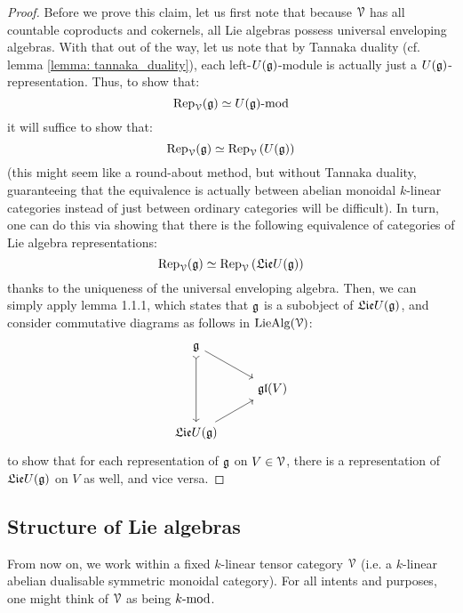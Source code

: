             \begin{proof}
                Before we prove this claim, let us first note that because $\calV$ has all countable coproducts and cokernels, all Lie algebras possess universal enveloping algebras. With that out of the way, let us note that by Tannaka duality (cf. lemma \ref{lemma: tannaka_duality}), each left-$U(\g)$-module is actually just a $U(\g)$-representation. Thus, to show that:
                    $$\Rep_{\calV}(\g) \cong {U(\g)}\mod$$
                it will suffice to show that:
                    $$\Rep_{\calV}(\g) \cong \Rep_{\calV}\left(U(\g)\right)$$
                (this might seem like a round-about method, but without Tannaka duality, guaranteeing that the equivalence is actually between abelian monoidal $k$-linear categories instead of just between ordinary categories will be difficult). In turn, one can do this via showing that there is the following equivalence of categories of Lie algebra representations:
                    $$\Rep_{\calV}(\g) \cong \Rep_{\calV}\left(\frakLie U(\g)\right)$$
                thanks to the uniqueness of the universal enveloping algebra. Then, we can simply apply lemma 1.1.1, which states that $\g$ is a subobject of $\frakLie U(\g)$, and consider commutative diagrams as follows in $\Lie\Alg(\calV)$:
                    $$
                        \begin{tikzcd}
                        	{\g} \\
                        	& {\gl(V)} \\
                        	{\frakLie U(\g)}
                        	\arrow[from=1-1, to=2-2]
                        	\arrow[from=3-1, to=2-2]
                        	\arrow[from=1-1, to=3-1, tail]
                        \end{tikzcd}
                    $$
                to show that for each representation of $\g$ on $V \in \calV$, there is a representation of $\frakLie U(\g)$ on $V$ as well, and vice versa.
            \end{proof}
            
    \subsection{Structure of Lie algebras}
        \begin{convention}
            From now on, we work within a fixed $k$-linear tensor category $\calV$ (i.e. a $k$-linear abelian dualisable symmetric monoidal category). For all intents and purposes, one might think of $\calV$ as being $k\mod$.
        \end{convention}
        
